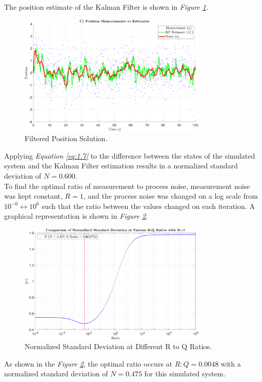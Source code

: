 \documentclass[10pt]{article}
\begin{document}
\begin{enumerate}[label=\textbf{\arabic*.}]
  The position estimate of the Kalman Filter is shown in \emph{Figure \ref{f:1.3}}.
  \begin{figure}[H]
    \centering
    \includegraphics[width=0.8\textwidth]{p1_c2.png}
    \caption{Filtered Position Solution.}
    \label{f:1.3}
  \end{figure}
  Applying \emph{Equation \ref{eq:1.7}} to the difference between the states of 
  the simulated system and the Kalman Filter estimation results in a normalized 
  standard deviation of $N=0.600$. \\

  To find the optimal ratio of measurement to process noise, measurement noise 
  was kept constant, $R=1$, and the process noise was changed on a log scale from 
  $10^{-6} \leftrightarrow 10^{6}$ such that the ratio between the values changed on each 
  iteration. A graphical representation is shown in \emph{Figure \ref{f:1.4}}.
  \begin{figure}[H]
    \centering
    \includegraphics[width=0.8\textwidth]{p1_e.png}
    \caption{Normalized Standard Deviation at Different R to Q Ratios.}
    \label{f:1.4}
  \end{figure}
  As shown in the \emph{Figure \ref{f:1.4}}, the optimal ratio occurs at 
  $R:Q=0.0048$ with a normalized standard deviation of $N=0.475$ for this 
  simulated system.


\end{enumerate}
\end{document}
